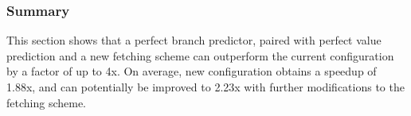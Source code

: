 \subsubsection{Summary}

This section shows that a perfect branch predictor, paired with perfect value prediction and a new fetching scheme can outperform the current configuration by a factor of up to 4x.
On average, new configuration obtains a speedup of 1.88x, and can potentially be improved to 2.23x with further modifications to the fetching scheme.

